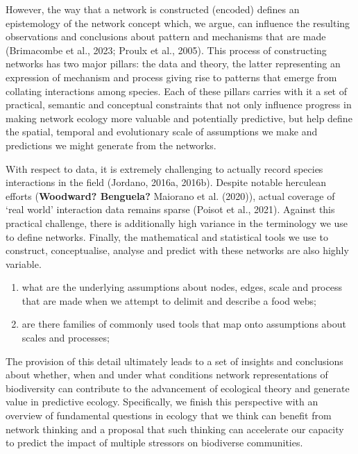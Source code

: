 \documentclass[
]{article}
\providecommand{\tightlist}{%
  \setlength{\itemsep}{0pt}\setlength{\parskip}{0pt}}\usepackage{longtable,booktabs,array}
\begin{document}
However, the way that a network is constructed (encoded) defines an
epistemology of the network concept which, we argue, can influence the
resulting observations and conclusions about pattern and mechanisms that
are made (Brimacombe et al., 2023; Proulx et al., 2005). This process of
constructing networks has two major pillars: the data and theory, the
latter representing an expression of mechanism and process giving rise
to patterns that emerge from collating interactions among species. Each
of these pillars carries with it a set of practical, semantic and
conceptual constraints that not only influence progress in making
network ecology more valuable and potentially predictive, but help
define the spatial, temporal and evolutionary scale of assumptions we
make and predictions we might generate from the networks.

With respect to data, it is extremely challenging to actually record
species interactions in the field (Jordano, 2016a, 2016b). Despite
notable herculean efforts (\textbf{Woodward? Benguela?} Maiorano et al.
(2020)), actual coverage of `real world' interaction data remains sparse
(Poisot et al., 2021). Against this practical challenge, there is
additionally high variance in the terminology we use to define networks.
Finally, the mathematical and statistical tools we use to construct,
conceptualise, analyse and predict with these networks are also highly
variable.

\begin{enumerate}
\def\labelenumi{\arabic{enumi}.}
\tightlist
\item
  what are the underlying assumptions about nodes, edges, scale and
  process that are made when we attempt to delimit and describe a food
  webs;
\item
  are there families of commonly used tools that map onto assumptions
  about scales and processes;
\end{enumerate}

The provision of this detail ultimately leads to a set of insights and
conclusions about whether, when and under what conditions network
representations of biodiversity can contribute to the advancement of
ecological theory and generate value in predictive ecology.
Specifically, we finish this perspective with an overview of fundamental
questions in ecology that we think can benefit from network thinking and
a proposal that such thinking can accelerate our capacity to predict the
impact of multiple stressors on biodiverse communities.
\end{document}
